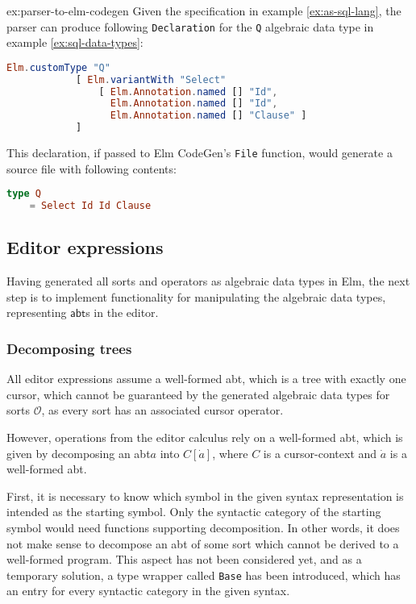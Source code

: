 \documentclass[sigplan,review]{acmart}
\newcommand{\abt}{\textsf{abt}\xspace}
\begin{document}
\begin{example}{ex:parser-to-elm-codegen}
  Given the specification in example \cref{ex:as-sql-lang}, the parser can produce following \texttt{Declaration} for the \texttt{Q} algebraic data type in example \cref{ex:sql-data-types}:
  \newpage
  \begin{lstlisting}[language=elm]
Elm.customType "Q"
            [ Elm.variantWith "Select"
                [ Elm.Annotation.named [] "Id",
                  Elm.Annotation.named [] "Id",
                  Elm.Annotation.named [] "Clause" ]
            ]
\end{lstlisting}

  This declaration, if passed to Elm CodeGen's \texttt{File} function, would generate a source file with following contents:
  \begin{lstlisting}[language=elm]
type Q
    = Select Id Id Clause
\end{lstlisting}
\end{example}

\subsection{Editor expressions}

Having generated all sorts and operators as algebraic data types in Elm,
the next step is to implement functionality for manipulating the algebraic
data types, representing $\abt$s in the editor.

\subsubsection{Decomposing trees}

All editor expressions assume a well-formed \abt, which is a tree
with exactly one cursor, which cannot be guaranteed by the generated
algebraic data types for sorts $\mathcal{O}$, as every sort has an associated cursor operator.

However, operations from the editor calculus rely on a well-formed \abt, which is given
by decomposing an \abt $a$ into $C[\dot{a}]$, where $C$ is a
cursor-context and $\dot{a}$ is a
well-formed \abt.

First, it is necessary to know which symbol in the given syntax representation
is intended as the starting symbol. Only the syntactic category of the starting symbol
would need functions supporting decomposition.
In other words, it does not make sense to decompose an \abt of some sort which
cannot be derived to a well-formed program.
This aspect has not been considered yet, and as a temporary solution,
a type wrapper called \texttt{Base} has been introduced, which has an entry for
every syntactic category in the given syntax.
\end{document}
